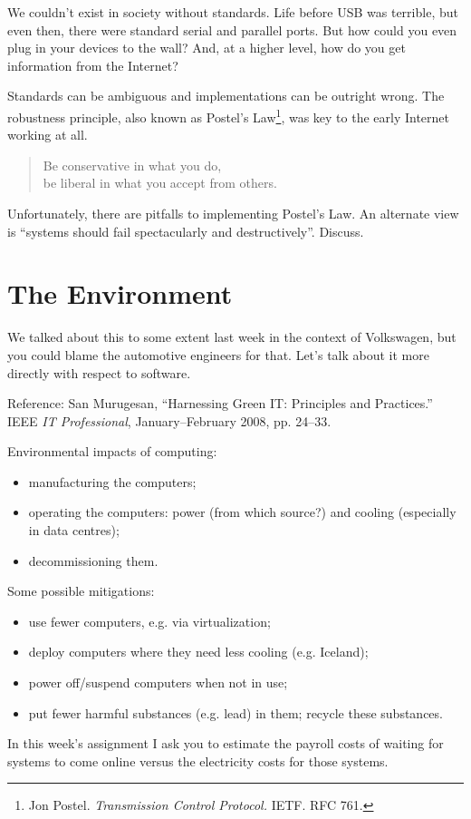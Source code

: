 \documentclass[11pt]{article}
\begin{document}
We couldn't exist in society without standards. Life before USB was terrible, but even then, there were standard serial and parallel ports. But how could you even plug in your devices to the wall? And, at a higher level, how do you get information from the Internet?

Standards can be ambiguous and implementations can be outright wrong. The robustness principle, also known as Postel's Law\footnote{Jon Postel. \emph{Transmission Control Protocol.} IETF. RFC 761.}, was key to the early Internet working at all.
\begin{quote}
  Be conservative in what you do,\\
  be liberal in what you accept from others.
\end{quote}

Unfortunately, there are pitfalls to implementing Postel's Law. An alternate view is ``systems should fail spectacularly and destructively''. Discuss.

\section*{The Environment}
We talked about this to some extent last week in the context of Volkswagen, but you could blame the automotive engineers for that. Let's talk about it more directly with respect to software.

\noindent
Reference: San Murugesan, ``Harnessing Green IT: Principles and Practices.'' IEEE \emph{IT Professional}, January--February 2008, pp. 24--33.

Environmental impacts of computing:
\begin{itemize}
\item manufacturing the computers;
\item operating the computers: power (from which source?) and cooling (especially in data centres);
\item decommissioning them.
\end{itemize}

Some possible mitigations:
\begin{itemize}
\item use fewer computers, e.g. via virtualization;
\item deploy computers where they need less cooling (e.g. Iceland);
\item power off/suspend computers when not in use;
\item put fewer harmful substances (e.g. lead) in them; recycle these substances.
\end{itemize}

In this week's assignment I ask you to estimate the payroll costs of waiting for systems to come online versus the electricity costs for those systems.



\end{document}
